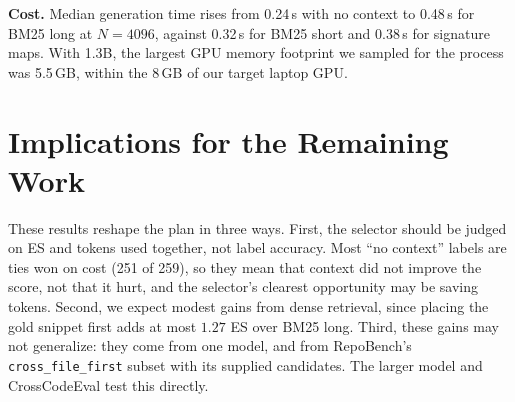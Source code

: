 \documentclass[10pt,twocolumn,letterpaper]{article}
\begin{document}
\textbf{Cost.} Median generation time rises from 0.24\,s with no context to 0.48\,s for BM25 long
at $N=4096$, against 0.32\,s for BM25 short and 0.38\,s for signature maps. With 1.3B, the largest
GPU memory footprint we sampled for the process was 5.5\,GB, within the 8\,GB of our target laptop GPU.

\section{Implications for the Remaining Work}

These results reshape the plan in three ways. First, the selector should be judged on
ES and tokens used together, not label accuracy. Most ``no context'' labels are ties
won on cost (251 of 259), so they mean that context did not improve the score, not that
it hurt, and the selector's clearest opportunity may be saving tokens. Second, we expect
modest gains from dense retrieval, since placing the gold snippet first adds at most
$1.27$ ES over BM25 long. Third, these gains may not generalize: they come from one
model, and from RepoBench's \texttt{cross\_file\_first} subset with its supplied
candidates. The larger model and CrossCodeEval test this directly.


{\small


}
\end{document}
